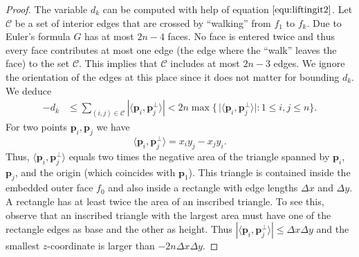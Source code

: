 \documentclass{article}
\theoremstyle{plain} \newtheorem{thm}{Theorem}[section]
\newcommand{\p}{\mathbf{p}}
\begin{document}
\begin{proof}
The variable $d_k$ can be computed with help of equation
$\eqref{equ:liftingit2}$. Let $\mathcal{C}$ be a set of interior edges 
that are crossed by ``walking'' from $f_1$ to $f_k$. Due to Euler's formula $G$ 
has at most $2n-4$ faces. No face is entered twice and thus every face 
contributes at most one edge (the edge where the ``walk'' leaves the face) to the set $\mathcal{C}$.
This implies that $\mathcal{C}$ includes at most $2n-3$ edges. We ignore the orientation of the edges
at this place since it does not matter for bounding $d_k$. We 
deduce
\begin{align*}
-d_k & \leq  \sum_{(i,j)\in\mathcal{C}}|\langle \p_i,\p_j^\bot
\rangle|
<  2n  \max\{\,\lvert\langle \p_i,\p_j^\bot\rangle\rvert \colon 1\leq i,j \leq n\}.
\end{align*}
For two points $\p_i,\p_j$ we have 
\[\langle
\p_i,\p_j^\bot\rangle = x_iy_j-x_jy_i.\]
Thus, $\langle
\p_i,\p_j^\bot\rangle$ equals
two times the negative area
of the triangle spanned by $\p_i$, $\p_j$, and the origin (which coincides with $\p_1$). 
This triangle is contained
inside the embedded outer face $f_0$ and also inside a rectangle with edge lengths
$\Delta x$ and $\Delta y$. A rectangle has at least twice the area of
an inscribed triangle. To see this, observe that an inscribed triangle
with the largest area must have one of the rectangle edges as base and
the other as height. Thus  $|\langle
\p_i,\p_j^\bot\rangle|\leq\Delta x\Delta y$ and 
the smallest $z$-coordinate is larger than $-2n\Delta x \Delta
y$.
\end{proof}
\end{document}
